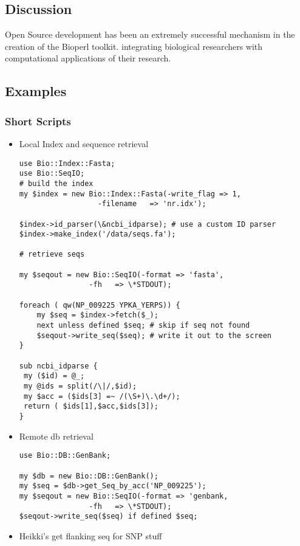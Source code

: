 \documentclass{article}
\begin{document}
\begin{twocolumn}
\section{Discussion}

Open Source development has been an extremely successful mechanism in
the creation of the Bioperl toolkit.  
integrating biological researchers with computational applications of
their research. 

\subsection{Examples}

\subsubsection{Short Scripts}
\begin{itemize}
\item Local Index and sequence retrieval

\begin{verbatim}
use Bio::Index::Fasta;
use Bio::SeqIO;
# build the index
my $index = new Bio::Index::Fasta(-write_flag => 1,
				  -filename   => 'nr.idx');

$index->id_parser(\&ncbi_idparse); # use a custom ID parser
$index->make_index('/data/seqs.fa');

# retrieve seqs

my $seqout = new Bio::SeqIO(-format => 'fasta',
			    -fh   => \*STDOUT);

foreach ( qw(NP_009225 YPKA_YERPS)) {
    my $seq = $index->fetch($_);
    next unless defined $seq; # skip if seq not found
    $seqout->write_seq($seq); # write it out to the screen
}

sub ncbi_idparse { 
 my ($id) = @_;
 my @ids = split(/\|/,$id);
 my $acc = ($ids[3] =~ /(\S+)\.\d+/);	
 return ( $ids[1],$acc,$ids[3]);	
}
\end{verbatim}

\item Remote db retrieval

\begin{verbatim}
use Bio::DB::GenBank;

my $db = new Bio::DB::GenBank();
my $seq = $db->get_Seq_by_acc('NP_009225');
my $seqout = new Bio::SeqIO(-format => 'genbank,
			    -fh   => \*STDOUT);
$seqout->write_seq($seq) if defined $seq;
\end{verbatim}

\item Heikki's get flanking seq for SNP stuff


\end{itemize}
\end{twocolumn}
\end{document}
